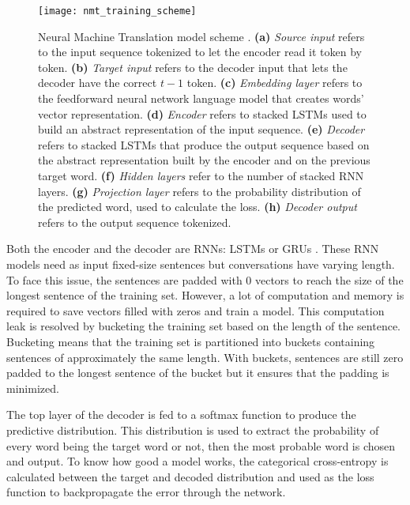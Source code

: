 \begin{figure}
    \centering
    \texttt{[image: nmt\_training\_scheme]}
    \decoRule
    \caption[Neural Machine Translation model scheme]{Neural Machine Translation model scheme \citep{tensorflow.nmt}. \textbf{(a)} \textit{Source input} refers to the input sequence tokenized to let the encoder read it token by token. \textbf{(b)} \textit{Target input} refers to the decoder input that lets the decoder have the correct $t-1$ token. \textbf{(c)} \textit{Embedding layer} refers to the feedforward neural network language model that creates words' vector representation. \textbf{(d)} \textit{Encoder} refers to stacked LSTMs used to build an abstract representation of the input sequence. \textbf{(e)} \textit{Decoder} refers to stacked LSTMs that produce the output sequence based on the abstract representation built by the encoder and on the previous target word. \textbf{(f)} \textit{Hidden layers} refer to the number of stacked RNN layers. \textbf{(g)} \textit{Projection layer} refers to the probability distribution of the predicted word, used to calculate the loss. \textbf{(h)} \textit{Decoder output} refers to the output sequence tokenized.}
    \label{fig:nmt}
\end{figure}

Both the encoder and the decoder are RNNs: LSTMs \citep{1409.3215,1508.04025} or GRUs \citep{1706.05125,1503.02364}. These RNN models need as input fixed-size sentences but conversations have varying length. To face this issue, the sentences are padded with $0$ vectors to reach the size of the longest sentence of the training set. However, a lot of computation and memory is required to save vectors filled with zeros and train a model. This computation leak is resolved by bucketing the training set based on the length of the sentence.
Bucketing means that the training set is partitioned into buckets containing sentences of approximately the same length. With buckets, sentences are still zero padded to the longest sentence of the bucket but it ensures that the padding is minimized.


The top layer of the decoder is fed to a softmax function to produce the predictive distribution. This distribution is used to extract the probability of every word being the target word or not, then the most probable word is chosen and output. To know how good a model works, the categorical cross-entropy is calculated between the target and decoded distribution and used as the loss function to backpropagate the error through the network.

